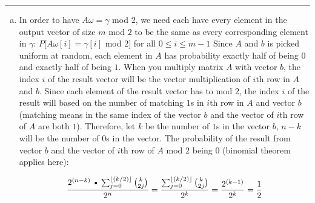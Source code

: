 \documentclass[11pt]{article}
\def\Cdot{\mathbin{\text{\normalfont \textbullet}}}
\begin{document}




\begin{quote}

\end{quote}
\hrule


\begin{solution}
\item
\begin{enumerate}[(a)]
    \item In order to have $A \omega = \gamma$ mod $2$, we need each have every element in the output vector of size $m$ mod $2$ to be the same as every corresponding element in $\gamma$:
    \newline
    \newline 
        $ P[A\omega[i] = \gamma[i]$ mod $2] $ for all $0 \leq i \leq m-1$
    \newline
    \newline
    Since $A$ and $b$ is picked uniform at random, each element in $A$ has probability exactly half of being $0$ and exactly half of being $1$. When you multiply matrix $A$ with vector $b$, the index $i$ of the result vector will be the vector multiplication of $i$th row in $A$ and $b$. Since each element of the result vector has to mod $2$, the index $i$ of the result will based on the number of matching $1$s in $i$th row in $A$ and vector $b$(matching means in the same index of the vector $b$ and the vector of $i$th row of $A$ are both $1$). 
    \newline
    Therefore, let $k$ be the number of $1$s in the vector $b$, $n-k$ will be the number of $0$s in the vector. The probability of the result from vector $b$ and the vector of $i$th row of $A$ mod $2$ being $0$ (binomial theorem applies here):
    
    $$\frac {2^{(n-k)}\Cdot\sum_{j=0}^{\floor{(k/2)}}{k\choose 2j }}{2^n} = \frac {\sum_{j=0}^{\floor{(k/2)}}{k\choose 2j }}{2^k} = \frac{2^{(k-1)}}{2^k} = \frac{1}{2}$$
    

\end{enumerate}
\end{solution}
\end{document}
